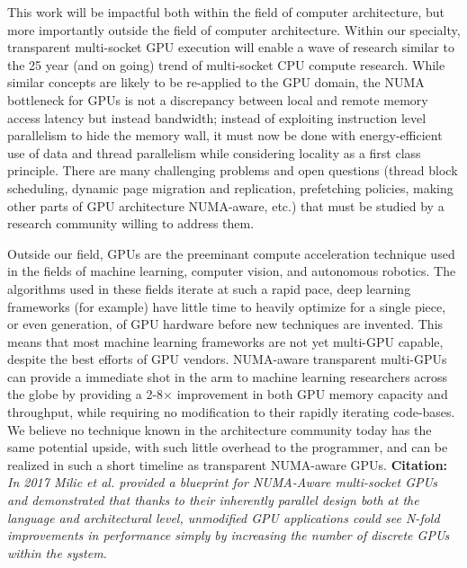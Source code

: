 \documentclass{sig-alternate}
\begin{document}
This work will be impactful both within the field of computer architecture, but 
more importantly outside the field of computer architecture.  Within our 
specialty, transparent multi-socket GPU execution will enable a wave of research 
similar to the 25 year (and on going) trend of multi-socket CPU compute 
research. While similar concepts are likely to be re-applied to the GPU domain, 
the NUMA bottleneck for GPUs is not a discrepancy between local and remote 
memory access latency but instead bandwidth;  instead of exploiting instruction 
level parallelism to hide the memory wall, it must now be done with energy-efficient 
use of data and thread parallelism while considering locality as a first class principle. 
There are many challenging problems and 
open questions (thread block scheduling, dynamic page migration and replication, 
prefetching policies, making other parts of GPU architecture NUMA-aware, etc.) 
that must be studied by a research community willing to address them.

Outside our field,  GPUs are the preeminant compute acceleration technique used in the fields
of machine learning, computer vision, and autonomous robotics.  The algorithms
used in these fields iterate at such a rapid pace, deep learning frameworks (for example)
have little time to heavily optimize for a single piece, or even generation, of GPU hardware
before new techniques are invented.  This means that most machine learning frameworks
are not yet multi-GPU capable, despite the best efforts of GPU vendors. NUMA-aware
transparent multi-GPUs can provide a immediate shot in the arm to machine learning researchers
across the globe by providing a 2-8$\times$ improvement in both GPU memory capacity and
throughput, while requiring no modification to their rapidly iterating code-bases.
We believe no technique known in the architecture community today has the same potential
upside, with such little overhead to the programmer, and can be realized in such a short timeline
as transparent NUMA-aware GPUs.  \textbf{Citation:} \textit{In 2017 Milic et al. provided a blueprint for NUMA-Aware
multi-socket GPUs and demonstrated that thanks to their inherently parallel design both at
the language and architectural level, unmodified GPU applications could see N-fold improvements 
in performance simply by increasing the number of discrete GPUs within the system.}


\vspace{-0.05in}

\end{document}

